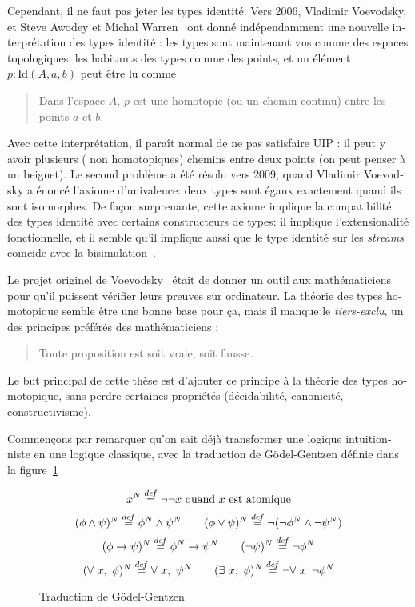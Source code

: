 \begin{otherlanguage}{french}
Cependant, il ne faut pas jeter les types identité. Vers 2006,
Vladimir Voevodsky, et Steve Awodey et Michal
Warren~\cite{awodey-warren} ont donné indépendamment une nouvelle
interprétation des types identité : les types sont maintenant vus
comme des espaces topologiques, les habitants des types comme des
points, et un élément $p:\mathrm{Id}(A,a,b)$ peut être lu comme
\begin{quotation}
  Dans l'espace $A$, $p$ est une homotopie (ou un chemin continu)
  entre les points $a$ et $b$.
\end{quotation}
Avec cette interprétation, il paraît normal de ne pas satisfaire UIP :
il peut y avoir plusieurs (\ie{} non homotopiques) chemins entre deux
points (on peut penser à un beignet). Le second problème a été résolu
vers 2009, quand Vladimir Voevodsky a énoncé l'axiome d'univalence:
deux types sont égaux exactement quand ils sont isomorphes. De façon
surprenante, cette axiome implique la compatibilité des types identité
avec certains constructeurs de types: il implique l'extensionalité
fonctionnelle, et il semble qu'il implique aussi que le type identité
sur les {\em streams} coïncide avec la
bisimulation~\cite{licata14uafs}.

Le projet originel de Voevodsky~\cite{vv-nsf} était de donner un outil
aux mathématiciens pour qu'il puissent vérifier leurs preuves sur
ordinateur. La théorie des types homotopique semble être une bonne
base pour ça, mais il manque le {\em tiers-exclu}, un des principes
préférés des mathématiciens :
\begin{quotation}
  Toute proposition est soit vraie, soit fausse.
\end{quotation}
Le but principal de cette thèse est d'ajouter ce principe à la théorie
des types homotopique, sans perdre certaines propriétés (décidabilité,
canonicité, constructivisme).

Commençons par remarquer qu'on sait déjà transformer une logique
intuitionniste en une logique classique, avec la traduction de
Gödel-Gentzen définie dans la figure~\ref{fig:GG-trans-fr}
\begin{figure}[ht]
  \centering

  \[x^N \overset{de\hspace{-0.2ex}f}{=} \lnot\lnot x\text{ quand $x$ est atomique}\]
  \[(\phi \land \psi)^N \overset{de\hspace{-0.2ex}f}{=} \phi^N \land \psi^N \qquad
  (\phi\lor \psi)^N \overset{de\hspace{-0.2ex}f}{=} \lnot (\lnot\phi^N \land \lnot \psi^N)\]
  \[(\phi \to \psi)^N \overset{de\hspace{-0.2ex}f}{=} \phi^N \to \psi^N \qquad
    (\lnot \psi)^N \overset{de\hspace{-0.2ex}f}{=} \lnot \phi^N\]
  \[(\forall\ x,\ \phi)^N \defeq \forall\ x,\ \psi^N \qquad
  (\exists\ x,\ \phi)^N \defeq \lnot\forall\ x\,\ \lnot\phi^N\]
  \caption{Traduction de Gödel-Gentzen}
  \label{fig:GG-trans-fr}
\end{figure}


\end{otherlanguage}
